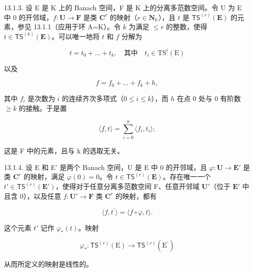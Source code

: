 13.1.3. 设 E 是 K 上的 Banach 空间，F 是 K 上的分离多范数空间。令 U 为 E 中 0 的开邻域，\(f\colon\mathbf{U}\to\mathbf{F}\) 是类 \(\mathbf{C}^{r}\) 的映射（\(r\in\mathbf{N}_{\mathbb{K}}\)），且 \(t\) 是 \(\mathsf{TS}^{(r)}(\mathbf{E})\) 的元素，参见 13.1.1（应用于环 A=K）。令 \(k\) 为满足 \(\leqslant r\) 的整数，使得 \(t\in\mathsf{TS}^{(k)}(\mathbf{E})\)。可以唯一地将 \(t\) 和 \(f\) 分解为

\[
t=t_{0}+\dots+t_{k},\quad\text{其中}\quad t_{i}\in\mathrm{TS}^{i}(\mathrm{E})
\]

以及

\[
f = f _ {0} + \dots + f _ {k} + h,
\]

其中 \(f_i\) 是次数为 \(i\) 的连续齐次多项式（\(0 \leqslant i \leqslant k\)），而 \(h\) 在点 0 处与 0 有阶数 \(\geqslant k\) 的接触。于是置

\[
\langle f, t \rangle = \sum_ {i = 0} ^ {k} \langle f _ {i}, t _ {i} \rangle ;
\]

这是 F 中的元素，且与 k 的选取无关。

13.1.4. 设 E 和 E' 是两个 Banach 空间，U 是 E 中 0 的开邻域，且 \(\varphi\colon\mathbf{U}\to\mathbf{E}'\) 是类 \(\mathbf{C}^{r}\) 的映射，满足 \(\varphi(0)=0\)。令 \(t\in\mathsf{TS}^{(r)}(\mathbf{E})\)。存在唯一一个 \(t'\in\mathsf{TS}^{(r)}(\mathbf{E}')\)，使得对于任意分离多范数空间 F、任意开邻域 \(\mathbf{U}'\)（位于 \(\mathbf{E}'\) 中且含 0），以及任意 \(f\colon\mathbf{U}'\to\mathbf{F}\) 类 \(\mathbf{C}^{r}\) 的映射，都有

\[
\langle f, t ^ {\prime} \rangle = \langle f \circ \varphi , t \rangle .\tag{*}
\]

这个元素 \(t'\) 记作 \(\varphi_{*}(t)\)。映射

\[
\varphi_ {*} \colon \mathsf {T S} ^ {(r)} (\mathrm{E}) \to \mathsf {T S} ^ {(r)} (\mathrm{E} ^ {\prime})
\]

从而所定义的映射是线性的。
